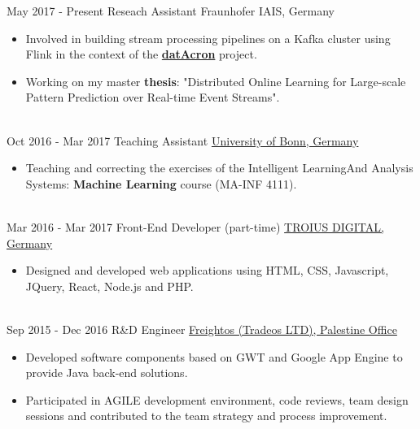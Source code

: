 \documentclass[letterpaper]{twentysecondcv} %
\begin{document}
\begin{twenty} %
	
	\twentyitem
	{May 2017 - }
	{Present}
	{  Reseach Assistant}
	{\href{https://www.iais.fraunhofer.de/?L=1}{}}
	{Fraunhofer IAIS, Germany}
	{\begin{itemize}
			\item Involved in building stream processing pipelines on a Kafka cluster using Flink in the context of the \href{http://www.datacron-project.eu/}{\textbf{datAcron}} project.
			
			\item Working on my master \textbf{thesis}: "Distributed Online Learning for Large-scale Pattern Prediction over Real-time Event Streams".
	\end{itemize}}
\\
		\twentyitem
	{Oct 2016 - }
	{Mar 2017}
	{ Teaching Assistant}
	{}
	{\href{https://www.kdml.iai.uni-bonn.de/teaching/winter-2016-17}{University of Bonn, Germany}}
	 {\begin{itemize}
			\item Teaching and correcting the exercises of the Intelligent Learning ​ And Analysis Systems:\textbf{ Machine Learning} course (MA-INF 4111).
	\end{itemize}}


        \\
	\twentyitem
    	{Mar 2016 -}
		{Mar 2017}
        { Front-End Developer (part-time)}
        {}
        {\href{https://twitter.com/TROIUS_DIGITAL}{TROIUS DIGITAL, Germany}}
        {
        {\begin{itemize}
        \item Designed and developed web applications using HTML, CSS, Javascript, JQuery, React, Node.js and PHP.
    \end{itemize}}
        }
    \\   
    \twentyitem
   		{Sep 2015 -}
		{Dec 2016}
        { R\&D Engineer}
        {}
        {\href{https://www.freightos.com/}{Freightos (Tradeos LTD), Palestine Office}}
        {
        {\begin{itemize}
        \item Developed software components based on GWT and Google App Engine to provide Java back-end solutions.
        \item Participated in AGILE development environment, code reviews, team design sessions and contributed to the team strategy and process improvement.
        

\end{itemize}}}
\end{twenty}
\end{document}
